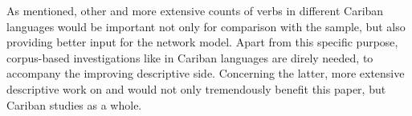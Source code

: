 As mentioned, other and more extensive counts of  verbs in different Cariban languages would be important not only for comparison with the \apalai sample, but also providing better input for the network model.
Apart from this specific purpose, corpus-based investigations like \textcite{sapien2021antipassive} in Cariban languages are direly needed, to accompany the improving descriptive side.
Concerning the latter, more extensive descriptive work on \yukpa and \carijo would not only tremendously benefit this paper, but Cariban studies as a whole.
%

